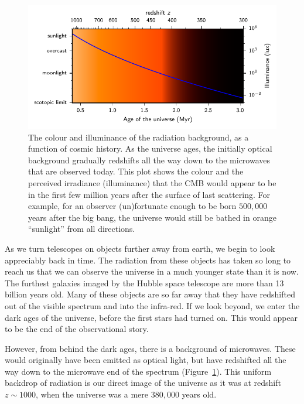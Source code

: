 \begin{figure}[tp]
  \centering
  \includegraphics[width=\textwidth]{chapters/inflationary_cosmology/figures/cmb_colour}
  \caption{The colour and illuminance of the radiation background, as a function of cosmic history. As the universe ages, the initially optical background gradually redshifts all the way down to the microwaves that are observed today. This plot shows the colour and the perceived irradiance (illuminance) that the CMB would appear to be in the first few million years after the surface of last scattering. For example, for an observer (un)fortunate enough to be born \(500,000\) years after the big bang, the universe would still be bathed in orange ``sunlight'' from all directions.}\label{fig:cos:cmb_colour}
\end{figure}

As we turn telescopes on objects further away from earth, we begin to look appreciably back in time. The radiation from these objects has taken so long to reach us that we can observe the universe in a much younger state than it is now. The furthest galaxies imaged by the Hubble space telescope are more than 13 billion years old. Many of these objects are so far away that they have redshifted out of the visible spectrum and into the infra-red. If we look beyond, we enter the dark ages of the universe, before the first stars had turned on. This would appear to be the end of the observational story.

However, from behind the dark ages, there is a background of microwaves. These would originally have been emitted as optical light, but have redshifted all the way down to the microwave end of the spectrum (Figure~\ref{fig:cos:cmb_colour}). This uniform backdrop of radiation is our direct image of the universe as it was at redshift \(z\sim1000\), when the universe was a mere \(380,000\) years old.

